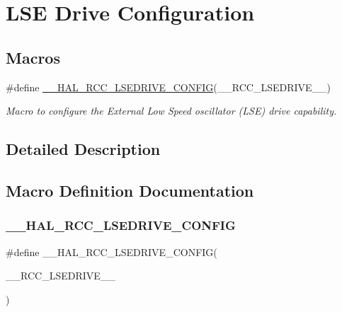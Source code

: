 \hypertarget{group___r_c_c_ex___l_s_e___configuration}{}\section{L\+SE Drive Configuration}
\label{group___r_c_c_ex___l_s_e___configuration}
\subsection*{Macros}
\begin{DoxyCompactItemize}
\item 
\#define \hyperlink{group___r_c_c_ex___l_s_e___configuration_ga9e21c193560567cfc3f908d733d9b19b}{\+\_\+\+\_\+\+H\+A\+L\+\_\+\+R\+C\+C\+\_\+\+L\+S\+E\+D\+R\+I\+V\+E\+\_\+\+C\+O\+N\+F\+IG}(\+\_\+\+\_\+\+R\+C\+C\+\_\+\+L\+S\+E\+D\+R\+I\+V\+E\+\_\+\+\_\+)
\begin{DoxyCompactList}\small\item\em Macro to configure the External Low Speed oscillator (L\+SE) drive capability. \end{DoxyCompactList}\end{DoxyCompactItemize}


\subsection{Detailed Description}


\subsection{Macro Definition Documentation}
\mbox{\label{group___r_c_c_ex___l_s_e___configuration_ga9e21c193560567cfc3f908d733d9b19b}} 
\subsubsection{\texorpdfstring{\+\_\+\+\_\+\+H\+A\+L\+\_\+\+R\+C\+C\+\_\+\+L\+S\+E\+D\+R\+I\+V\+E\+\_\+\+C\+O\+N\+F\+IG}{\_\_HAL\_RCC\_LSEDRIVE\_CONFIG}}
{\footnotesize\ttfamily \#define \+\_\+\+\_\+\+H\+A\+L\+\_\+\+R\+C\+C\+\_\+\+L\+S\+E\+D\+R\+I\+V\+E\+\_\+\+C\+O\+N\+F\+IG(\begin{DoxyParamCaption}\item[{}]{\+\_\+\+\_\+\+R\+C\+C\+\_\+\+L\+S\+E\+D\+R\+I\+V\+E\+\_\+\+\_\+ }\end{DoxyParamCaption})}

